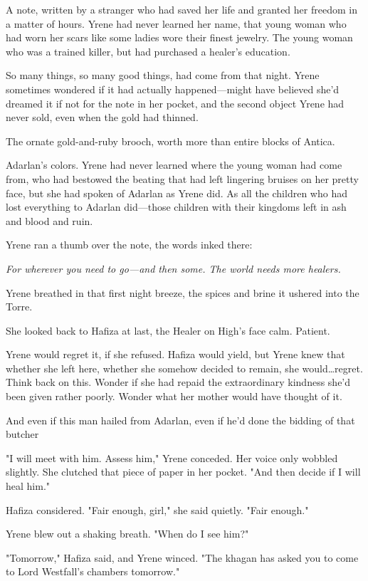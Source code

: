 A note, written by a stranger who had saved her life and granted her freedom in a matter of hours.
Yrene had never learned her name, that young woman who had worn her scars like some ladies wore their finest jewelry.
The young woman who was a trained killer, but had purchased a healer's education.

So many things, so many good things, had come from that night.
Yrene sometimes wondered if it had actually happened---might have believed she'd dreamed it if not for the note in her pocket, and the second object Yrene had never sold, even when the gold had thinned.

The ornate gold-and-ruby brooch, worth more than entire blocks of Antica.

Adarlan's colors.
Yrene had never learned where the young woman had come from, who had bestowed the beating that had left lingering bruises on her pretty face, but she had spoken of Adarlan as Yrene did.
As all the children who had lost everything to Adarlan did---those children with their kingdoms left in ash and blood and ruin.

Yrene ran a thumb over the note, the words inked there:

\emph{For wherever you need to go---and then some.
The world needs more healers.}

Yrene breathed in that first night breeze, the spices and brine it ushered into the Torre.

She looked back to Hafiza at last, the Healer on High's face calm.
Patient.

Yrene would regret it, if she refused.
Hafiza would yield, but Yrene knew that whether she left here, whether she somehow decided to remain, she would\ldots regret.
Think back on this.
Wonder if she had repaid the extraordinary kindness she'd been given rather poorly.
Wonder what her mother would have thought of it.

And even if this man hailed from Adarlan, even if he'd done the bidding of that butcher 

"I will meet with him.
Assess him," Yrene conceded.
Her voice only wobbled slightly.
She clutched that piece of paper in her pocket.
"And then decide if I will heal him."

Hafiza considered.
"Fair enough, girl," she said quietly.
"Fair enough."

Yrene blew out a shaking breath.
"When do I see him?"

"Tomorrow," Hafiza said, and Yrene winced.
"The khagan has asked you to come to Lord Westfall's chambers tomorrow."

